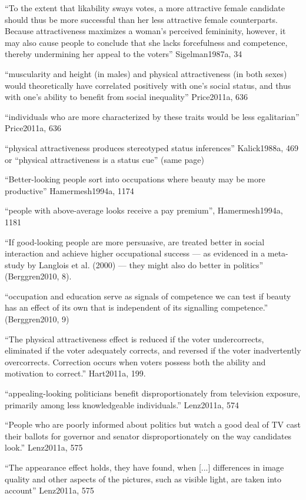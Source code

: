 ``To the extent that likability sways votes, a more attractive female candidate should thus be more successful than her less attractive female counterparts. Because attractiveness maximizes a woman's perceived femininity, however, it may also cause people to conclude that she lacks forcefulness and competence, thereby undermining her appeal to the voters''  Sigelman1987a, 34


``muscularity and height (in males) and physical attractiveness (in both sexes) would theoretically have correlated positively with one’s social status, and thus with one's ability to benefit from social inequality'' Price2011a, 636

``individuals who are more characterized by these traits would be less egalitarian'' Price2011a, 636

``physical attractiveness produces stereotyped status inferences'' Kalick1988a, 469 or ``physical attractiveness is a status cue'' (same page)

``Better-looking people sort into occupations where beauty may be more productive'' Hamermesh1994a, 1174

``people with above-average looks receive a pay premium'', Hamermesh1994a, 1181

``If good-looking people are more persuasive, are treated better in social interaction and achieve higher occupational success — as evidenced in a meta-study by Langlois et al. (2000) — they might also do better in politics'' (Berggren2010, 8).

``occupation and education serve as signals of competence we can test if beauty has an effect of its own that is independent of its signalling competence.'' (Berggren2010, 9)

``The physical attractiveness effect is reduced if the voter undercorrects, eliminated if the voter adequately corrects, and reversed if the voter inadvertently overcorrects. Correction occurs when voters possess both the ability and motivation to correct.'' Hart2011a, 199.

``appealing-looking politicians benefit disproportionately from television exposure, primarily among less knowledgeable individuals.'' Lenz2011a, 574

``People who are poorly informed about politics but watch a good deal of TV cast their ballots for governor and senator disproportionately on the way candidates look.'' Lenz2011a, 575

``The appearance effect holds, they have found, when [...] differences in image quality and other aspects of the pictures, such as visible light, are taken into account'' Lenz2011a, 575

